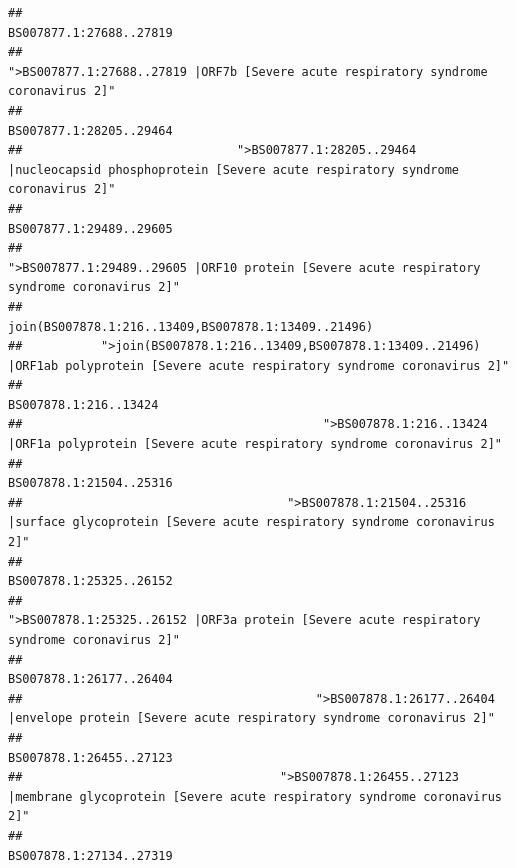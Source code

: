 \documentclass[
]{article}
\begin{document}
\begin{verbatim}
##                                                                                                                BS007877.1:27688..27819 
##                                                    ">BS007877.1:27688..27819 |ORF7b [Severe acute respiratory syndrome coronavirus 2]" 
##                                                                                                                BS007877.1:28205..29464 
##                              ">BS007877.1:28205..29464 |nucleocapsid phosphoprotein [Severe acute respiratory syndrome coronavirus 2]" 
##                                                                                                                BS007877.1:29489..29605 
##                                            ">BS007877.1:29489..29605 |ORF10 protein [Severe acute respiratory syndrome coronavirus 2]" 
##                                                                                    join(BS007878.1:216..13409,BS007878.1:13409..21496) 
##           ">join(BS007878.1:216..13409,BS007878.1:13409..21496) |ORF1ab polyprotein [Severe acute respiratory syndrome coronavirus 2]" 
##                                                                                                                  BS007878.1:216..13424 
##                                          ">BS007878.1:216..13424 |ORF1a polyprotein [Severe acute respiratory syndrome coronavirus 2]" 
##                                                                                                                BS007878.1:21504..25316 
##                                     ">BS007878.1:21504..25316 |surface glycoprotein [Severe acute respiratory syndrome coronavirus 2]" 
##                                                                                                                BS007878.1:25325..26152 
##                                            ">BS007878.1:25325..26152 |ORF3a protein [Severe acute respiratory syndrome coronavirus 2]" 
##                                                                                                                BS007878.1:26177..26404 
##                                         ">BS007878.1:26177..26404 |envelope protein [Severe acute respiratory syndrome coronavirus 2]" 
##                                                                                                                BS007878.1:26455..27123 
##                                    ">BS007878.1:26455..27123 |membrane glycoprotein [Severe acute respiratory syndrome coronavirus 2]" 
##                                                                                                                BS007878.1:27134..27319 

\end{verbatim}
\end{document}
